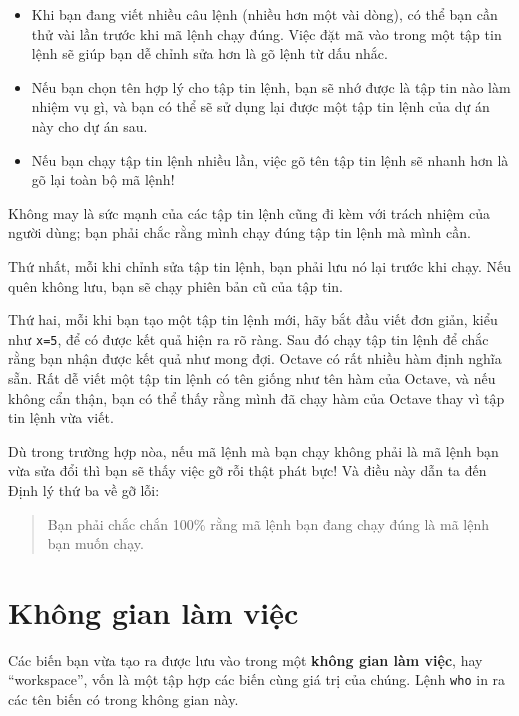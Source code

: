 \documentclass[12pt]{book}
\begin{document}
\begin{itemize}

\item Khi bạn đang viết nhiều câu lệnh (nhiều hơn một vài dòng), có thể
bạn cần thử vài lần trước khi mã lệnh chạy đúng. Việc đặt mã vào trong
một tập tin lệnh sẽ giúp bạn dễ chỉnh sửa hơn là gõ lệnh từ dấu nhắc.

\item Nếu bạn chọn tên hợp lý cho tập tin lệnh, bạn sẽ nhớ được là
tập tin nào làm nhiệm vụ gì, và bạn có thể sẽ sử dụng lại được một
tập tin lệnh của dự án này cho dự án sau.

\item Nếu bạn chạy tập tin lệnh nhiều lần, việc gõ tên tập tin lệnh sẽ 
nhanh hơn là gõ lại toàn bộ mã lệnh!

\end{itemize}

Không may là sức mạnh của các tập tin lệnh cũng đi kèm với trách nhiệm
của người dùng; bạn phải chắc rằng mình chạy đúng tập tin lệnh mà
mình cần.

Thứ nhất, mỗi khi chỉnh sửa tập tin lệnh, bạn phải lưu nó lại trước khi 
chạy. Nếu quên không lưu, bạn sẽ chạy phiên bản cũ của tập tin.

Thứ hai, mỗi khi bạn tạo một tập tin lệnh mới, hãy bắt đầu viết 
đơn giản, kiểu như {\tt x=5}, để có được kết quả hiện ra rõ ràng. Sau đó
chạy tập tin lệnh để chắc rằng bạn nhận được kết quả như mong đợi.
Octave có rất nhiều hàm định nghĩa sẵn. Rất dễ viết một tập tin lệnh
có tên giống như tên hàm của Octave, và nếu không cẩn thận, bạn
có thể thấy rằng mình đã chạy hàm của Octave thay vì tập tin lệnh
vừa viết.

Dù trong trường hợp nòa, nếu mã lệnh mà bạn chạy không phải là mã
lệnh bạn vừa sửa đổi thì bạn sẽ thấy việc gỡ rỗi thật phát bực! Và 
điều này dẫn ta đến Định lý thứ ba về gỡ lỗi:

\begin{quote}
Bạn phải chắc chắn 100\% rằng mã lệnh bạn đang chạy đúng là
mã lệnh bạn muốn chạy.
\end{quote}



\section{Không gian làm việc}

Các biến bạn vừa tạo ra được lưu vào trong một {\bf không gian làm việc},
hay ``workspace'', vốn là một tập hợp các biến cùng giá trị của chúng.
Lệnh {\tt who} in ra các tên biến có trong không gian này.
\end{document}
